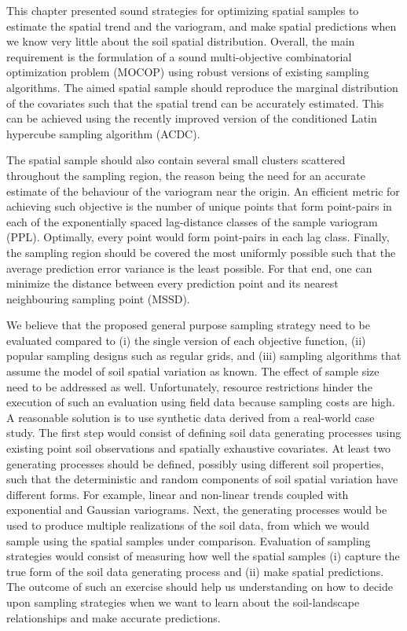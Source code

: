 This chapter presented sound strategies for optimizing spatial samples to estimate the spatial trend and the 
variogram, and make spatial predictions when we know very little about the soil spatial distribution. Overall, 
the main requirement is the formulation of a sound multi-objective combinatorial optimization problem (MOCOP) 
using robust versions of existing sampling algorithms. The aimed spatial sample should reproduce the marginal 
distribution of the covariates such that the spatial trend can be accurately estimated. This can be achieved 
using the recently improved version of the conditioned Latin hypercube sampling algorithm (ACDC).

The spatial sample should also contain several small clusters scattered throughout the sampling region, the 
reason being the need for an accurate estimate of the behaviour of the variogram near the origin. An efficient 
metric for achieving such objective is the number of unique points that form point-pairs in each of the 
exponentially spaced lag-distance classes of the sample variogram (PPL). Optimally, every point would form 
point-pairs in each lag class. Finally, the sampling region should be covered the most uniformly possible such 
that the average prediction error variance is the least possible. For that end, one can minimize the distance 
between every prediction point and its nearest neighbouring sampling point (MSSD).

We believe that the proposed general purpose sampling strategy need to be evaluated compared to (i) the single 
version of each objective function, (ii) popular sampling designs such as regular grids, and (iii) sampling 
algorithms that assume the model of soil spatial variation as known. The effect of sample size need to be 
addressed as well. Unfortunately, resource restrictions hinder the execution of such an evaluation using field 
data because sampling costs are high. A reasonable solution is to use synthetic data derived from a real-world 
case study. The first step would consist of defining soil data generating processes using existing point soil 
observations and spatially exhaustive covariates. At least two generating processes should be defined, 
possibly using different soil properties, such that the deterministic and random components of soil spatial 
variation have different forms. For example, linear and non-linear trends coupled with exponential and 
Gaussian variograms. Next, the generating processes would be used to produce multiple realizations of the soil 
data, from which we would sample using the spatial samples under comparison. Evaluation of sampling strategies 
would consist of measuring how well the spatial samples (i) capture the true form of the soil data generating 
process and (ii) make spatial predictions. The outcome of such an exercise should help us understanding on how 
to decide upon sampling strategies when we want to learn about the soil-landscape relationships and make 
accurate predictions.

